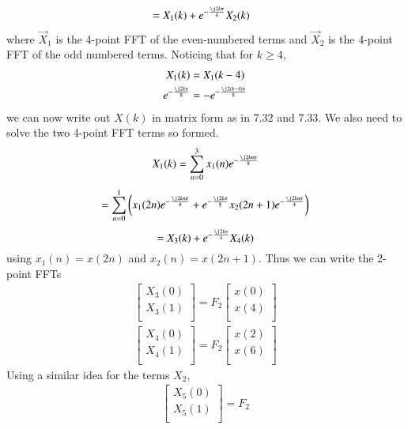 \documentclass[journal,12pt,twocolumn]{IEEEtran}
\renewcommand\thesection{\arabic{section}}
\begin{document}
\begin{enumerate}[label=\thesection.\arabic*
	,ref=\thesection.\theenumi]
\begin{enumerate}[label=\arabic*.,ref=\thesection.\theenumi]
\begin{align}
	&= X_1(k) + e^{-\frac{\j2k\pi}{4}}X_2(k) 
\end{align}
where $\vec{X}_1$ is the 4-point FFT of the even-numbered terms and $\vec{X}_2$ is the 4-point FFT of the odd numbered terms. Noticing that for $k \geq 4$,
\begin{align}
	X_1(k) &= X_1(k - 4) \\
	e^{-\frac{\j2k\pi}{8}} &= -e^{-\frac{\j2(k - 4)\pi}{8}}
\end{align}
we can now write out $X(k)$ in matrix form as in 7.32 and 7.33. We also need to solve the two 4-point FFT terms so formed.
\begin{equation}
	X_1(k) = \sum_{n = 0}^{3}x_1(n)e^{-\frac{\j2kn\pi}{8}}
\end{equation}
\begin{equation}
	= \sum_{n = 0}^{1}\brak{x_1(2n)e^{-\frac{\j2kn\pi}{4}} + e^{-\frac{\j2k\pi}{8}}x_2(2n + 1)e^{-\frac{\j2kn\pi}{4}}}
\end{equation}
\begin{equation}	
	= X_3(k) + e^{-\frac{\j2k\pi}{4}}X_4(k) 
\end{equation}
using $x_1(n) = x(2n)$ and $x_2(n) = x(2n + 1)$. Thus we can write the 2-point FFTs
\begin{align}
	\begin{bmatrix}
		X_{3}(0) \\ 
		X_{3}(1)\\ 
	\end{bmatrix}
	= F_{2}
	\begin{bmatrix}
		x(0) \\ 
		x(4) \\ 
	\end{bmatrix} \\
	\begin{bmatrix}
		X_{4}(0) \\ 
		X_{4}(1)\\ 
	\end{bmatrix}
	= F_{2}
	\begin{bmatrix}
		x(2) \\ 
		x(6) \\ 
	\end{bmatrix}
\end{align}
Using a similar idea for the terms $X_2$, 
\begin{align}
	\begin{bmatrix}
		X_{5}(0) \\ 
		X_{5}(1)\\ 
	\end{bmatrix}
	= F_{2}

\end{align}
\end{enumerate}
\end{enumerate}
\end{document}
